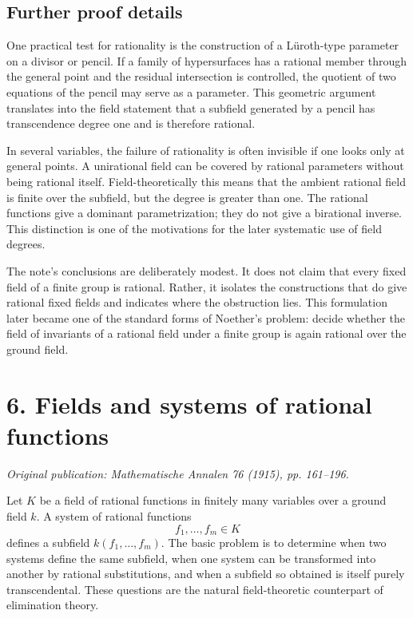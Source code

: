 \documentclass[11pt]{article}
\begin{document}
\subsection{Further proof details}

One practical test for rationality is the construction of a Lüroth-type parameter on a divisor or
pencil. If a family of hypersurfaces has a rational member through the general point and the
residual intersection is controlled, the quotient of two equations of the pencil may serve as a
parameter. This geometric argument translates into the field statement that a subfield generated by
a pencil has transcendence degree one and is therefore rational.

In several variables, the failure of rationality is often invisible if one looks only at general
points. A unirational field can be covered by rational parameters without being rational itself.
Field-theoretically this means that the ambient rational field is finite over the subfield, but the
degree is greater than one. The rational functions give a dominant parametrization; they do not give
a birational inverse. This distinction is one of the motivations for the later systematic use of
field degrees.

The note's conclusions are deliberately modest. It does not claim that every fixed field of a finite
group is rational. Rather, it isolates the constructions that do give rational fixed fields and
indicates where the obstruction lies. This formulation later became one of the standard forms of
Noether's problem: decide whether the field of invariants of a rational field under a finite group
is again rational over the ground field.


\section{6. Fields and systems of rational functions}

\textit{Original publication: Mathematische Annalen 76 (1915), pp. 161--196.}

Let \(K\) be a field of rational functions in finitely many variables over a ground field \(k\). A
system of rational functions \[   f_1,\ldots,f_m\in K \] defines a subfield \(k(f_1, \ldots,f_m)\).
The basic problem is to determine when two systems define the same subfield, when one system can be
transformed into another by rational substitutions, and when a subfield so obtained is itself purely
transcendental. These questions are the natural field-theoretic counterpart of elimination theory.
\end{document}
